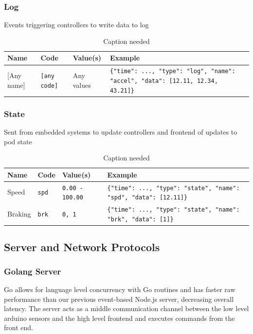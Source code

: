 \documentclass[main.tex]{subfiles}
\begin{document}
    \subsubsection{Log}
    Events triggering controllers to write data to log
    \begin{table}[H]
        \centering
        \begin{tabularx}{\textwidth}{@{}lllX@{}} \toprule
            Name & Code & Value(s) & Example \\ \midrule
            {[Any name]} & \texttt{[any code]} & Any values & \texttt{\{"time": ..., "type": "log", "name": "accel", "data": [12.11, 12.34, 43.21]\}} \\ \bottomrule
        \end{tabularx}
        \caption{Caption needed}
    \end{table}
    \subsubsection{State}
    Sent from embedded systems to update controllers and frontend of updates to pod state
    \begin{table}[H]
        \centering
        \begin{tabularx}{\textwidth}{@{}lllX@{}} \toprule
            Name & Code & Value(s) & Example \\ \midrule
            Speed & \texttt{spd} & \texttt{0.00 - 100.00} & \texttt{\{"time": ..., "type": "state", "name": "spd", "data": [12.11]\}} \\
            Braking & \texttt{brk} & \texttt{0, 1} & \texttt{\{"time": ..., "type": "state", "name": "brk", "data": [1]\}} \\ \bottomrule
        \end{tabularx}
        \caption{Caption needed}
    \end{table}
    \subsection{Server and Network Protocols}
    \subsubsection{Golang Server}
    Go allows for language level concurrency with Go routines and has faster raw performance than our previous event-based Node.js server, decreasing overall latency. The server acts as a middle communication channel between the low level arduino sensors and the high level frontend and executes commands from the front end.
\end{document}
